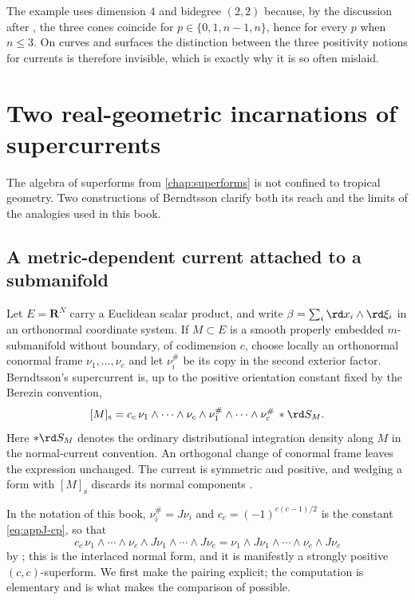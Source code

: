 \begin{remark}
\label{rem:ch14-cones-low-dimension}
The example uses dimension $4$ and bidegree $(2,2)$ because, by the
discussion after , the three cones
coincide for $p\in\{0,1,n-1,n\}$, hence for every $p$ when $n\le3$.  On
curves and surfaces the distinction between the three positivity notions for
currents is therefore invisible, which is exactly why it is so often
mislaid.
\end{remark}

\section{Two real-geometric incarnations of supercurrents}
\label{sec:ch14-berndtsson}

The algebra of superforms from \cref{chap:superforms} is not confined to tropical
geometry.  Two constructions of Berndtsson clarify both its reach and the
limits of the analogies used in this book.

\subsection{A metric-dependent current attached to a submanifold}
\label{sec:ch14-berndtsson-submanifold}

Let $E=\mathbf R^N$ carry a Euclidean scalar product, and write
$\beta=\sum_i \rd x_i\wedge \rd\xi_i$ in an orthonormal coordinate system.  If
$M\subset E$ is a smooth properly embedded $m$-submanifold without
boundary, of codimension $c$, choose locally an
orthonormal conormal frame $\nu_1,\ldots,\nu_c$ and let $\nu_i^\#$ be its copy
in the second exterior factor.  Berndtsson's supercurrent is, up to the
positive orientation constant fixed by the Berezin convention,
\[
 [M]_{\mathrm s}
 =c_c\,\nu_1\wedge\cdots\wedge\nu_c
       \wedge\nu_1^\#\wedge\cdots\wedge\nu_c^\#\,*\rd S_M .
\]
Here $*\rd S_M$ denotes the ordinary distributional integration density along
$M$ in the normal-current convention.  An orthogonal change of conormal
frame leaves the expression unchanged.
The current is symmetric and positive, and wedging a form with
$[M]_{\mathrm s}$ discards its normal components
\cite[\S4]{Ber19Super}.

In the notation of this book, $\nu_i^\#=J\nu_i$ and
$c_c=(-1)^{c(c-1)/2}$ is the constant \eqref{eq:appJ-cp}, so that
\[
 c_c\,\nu_1\wedge\cdots\wedge\nu_c\wedge J\nu_1\wedge\cdots\wedge J\nu_c
 =\nu_1\wedge J\nu_1\wedge\cdots\wedge\nu_c\wedge J\nu_c
\]
by ; this is the interlaced normal form, and it is
manifestly a strongly positive $(c,c)$-superform.  We first make the pairing
explicit; the computation is elementary and is what makes the comparison of
 possible.

